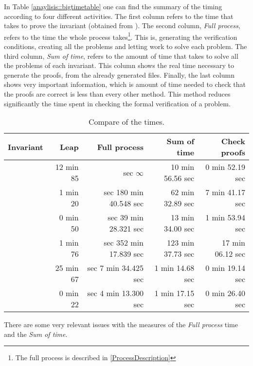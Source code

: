 In Table \ref{anaylisis::bigtimetable} one can find the summary of the timing according to four different activities. The first column refers to the time that \leap takes to prove the invariant (obtained from \cite{paperParametrizedInvariants}). 
%
The second column, \textit{Full process}, refers to the time the whole process takes\footnote{The full process is described in \ref{ProcessDescription}}. 
%
This is, generating the verification conditions, creating all the \spass problems and letting \spass work to solve each problem.
%
The third column, \textit{Sum of \spass time}, refers to the amount of time that \spass takes to solve all the problems of each invariant.
%
This column shows the real time necessary to generate the proofs, from the already generated files.
%
Finally, the last column shows very important information,
%
which is amount of time needed to check that the proofs are correct is less than every other method. 
%
This method reduces significantly the time spent in checking the formal verification of a problem.


\begin{table}[hbtp]
\centering
\begin{tabular}{r|rrrr}
Invariant 		& Leap 	& Full process 		& Sum of \spass time 	& Check proofs 	\\\hline
\invPreserve 	& 12 min 85	& sec $\infty$			& 10 min 56.56 sec				& 0 min 52.19 sec		\\
\invOrder		& 1 min 20	& sec 180 min 40.548 sec		& 62 min 32.89 sec				& 7 min 41.17 sec 		\\
\invLock		& 0 min 50	& sec 39 min 28.321 sec			& 13 min 34.00 sec 				& 1 min 53.94 sec		\\
\invNext 		& 1 min 76	& sec 352 min 17.839 sec		& 123 min 37.73 sec				& 17 min 06.12 sec		\\
\invRegion		& 25 min 67	& sec 7 min 34.425 sec			& 1 min 14.68 sec				& 0 min 19.14 sec		\\
\invDisjoint 	& 0 min 22 	& sec 4 min 13.300 sec 			& 1 min 17.15 sec 				& 0 min 26.40 sec		\\
\end{tabular}
\caption{Compare of the times.}
\label{analysis:bigtimetable}
\end{table}


There are some very relevant issues with the measures of the \textit{Full process} time and the \textit{Sum of \spass time}.

